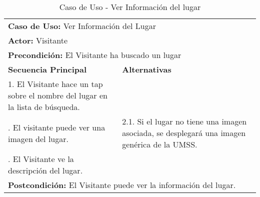 \begin{table}[H]
  \begin{center}
    \begin{tabularx}{0.75\textwidth}{ X X  }
      \toprule
      \multicolumn{2}{l}{\textbf{Caso de Uso:} Ver Información del Lugar} \\
      \multicolumn{2}{l}{\textbf{Actor:} Visitante} \\
      \multicolumn{2}{l}{\textbf{Precondición:} El Visitante ha buscado un lugar} \\
      \addlinespace
      \textbf{Secuencia Principal} & \textbf{Alternativas} \\
      \midrule
      1. El Visitante hace un tap sobre el nombre del lugar en la lista de búsqueda. \\
      \addlinespace
      2. El visitante puede ver una imagen del lugar. &
      2.1. Si el lugar no tiene una imagen asociada, se desplegará una imagen genérica de la UMSS.\\
      \addlinespace
      3. El Visitante ve la descripción del lugar. & \\

      \midrule
      \multicolumn{2}{l}{\textbf{Postcondición:} El Visitante puede ver la información del lugar.} \\
      \bottomrule
    \end{tabularx}
    \caption{Caso de Uso - Ver Información del lugar}
    \label{tab:cu_info_lugar}
  \end{center}
\end{table}


